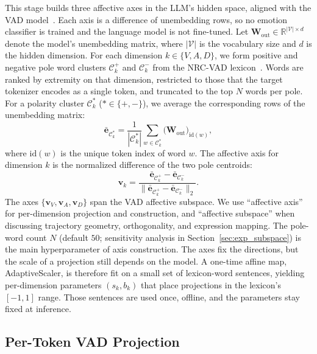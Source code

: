 \documentclass[letterpaper, 10 pt, conference]{ieeeconf}
\begin{document}
This stage builds three affective axes in the LLM's hidden space, aligned with the VAD model~\cite{russell1977evidence}. Each axis is a difference of unembedding rows, so no emotion classifier is trained and the language model is not fine-tuned.
Let $\mathbf{W}_{\mathrm{out}} \in \mathbb{R}^{|\mathcal{V}| \times d}$ denote the model's unembedding matrix, where $|\mathcal{V}|$ is the vocabulary size and $d$ is the hidden dimension.
For each dimension $k \in \{V, A, D\}$, we form positive and negative pole word clusters $\mathcal{C}^{+}_k$ and $\mathcal{C}^{-}_k$ from the NRC-VAD lexicon~\cite{mohammad2018nrcvad}. Words are ranked by extremity on that dimension, restricted to those that the target tokenizer encodes as a single token, and truncated to the top $N$ words per pole.
For a polarity cluster $\mathcal{C}^{*}_k$ ($* \in \{+, -\}$), we average the corresponding rows of the unembedding matrix:
\begin{equation}
    \bar{\mathbf{e}}_{\mathcal{C}^{*}_k} = \frac{1}{|\mathcal{C}^{*}_k|}\sum_{w \in \mathcal{C}^{*}_k} \bigl(\mathbf{W}_{\mathrm{out}}\bigr)_{\mathrm{id}(w)},
\end{equation}
where $\mathrm{id}(w)$ is the unique token index of word $w$.
The affective axis for dimension $k$ is the normalized difference of the two pole centroids:
\begin{equation}
    \mathbf{v}_k = \frac{\bar{\mathbf{e}}_{\mathcal{C}^{+}_k} - \bar{\mathbf{e}}_{\mathcal{C}^{-}_k}}{\bigl\|\bar{\mathbf{e}}_{\mathcal{C}^{+}_k} - \bar{\mathbf{e}}_{\mathcal{C}^{-}_k}\bigr\|_2}.
    \label{eq:valence_axis}
\end{equation}
The axes $\{\mathbf{v}_V, \mathbf{v}_A, \mathbf{v}_D\}$ span the VAD affective subspace. We use ``affective axis'' for per-dimension projection and construction, and ``affective subspace'' when discussing trajectory geometry, orthogonality, and expression mapping.
The pole-word count $N$ (default $50$; sensitivity analysis in Section~\ref{sec:exp_subspace}) is the main hyperparameter of axis construction.
The axes fix the directions, but the scale of a projection still depends on the model. A one-time affine map, AdaptiveScaler, is therefore fit on a small set of lexicon-word sentences, yielding per-dimension parameters $(s_k, b_k)$ that place projections in the lexicon's $[-1, 1]$ range. Those sentences are used once, offline, and the parameters stay fixed at inference.

\subsection{Per-Token VAD Projection}
\label{sec:projection}
\end{document}
